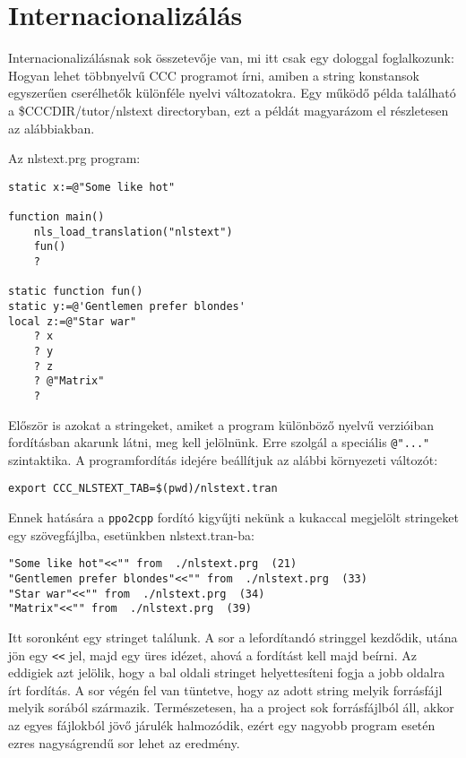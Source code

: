 \section{Internacionalizálás}

Internacionalizálásnak sok összetevője van, 
mi itt csak egy dologgal foglalkozunk: 
Hogyan lehet többnyelvű CCC programot írni, 
amiben a string konstansok egyszerűen cserélhetők különféle 
nyelvi változatokra. 
Egy működő példa található a \$CCCDIR/tutor/nlstext directoryban, 
ezt a példát magyarázom el részletesen az alábbiakban.

Az nlstext.prg program:
\begin{verbatim}
static x:=@"Some like hot"

function main()
    nls_load_translation("nlstext")
    fun()
    ?

static function fun()
static y:=@'Gentlemen prefer blondes'
local z:=@"Star war"
    ? x
    ? y
    ? z
    ? @"Matrix"
    ?
\end{verbatim}
Először is azokat a stringeket, amiket a program különböző 
nyelvű verzióiban fordításban akarunk látni, meg kell jelölnünk.
Erre szolgál a speciális \verb!@"..."! szintaktika.
A programfordítás idejére beállítjuk az alábbi 
környezeti változót:
\begin{verbatim}
export CCC_NLSTEXT_TAB=$(pwd)/nlstext.tran
\end{verbatim}
Ennek hatására a \verb!ppo2cpp! fordító kigyűjti nekünk a 
kukaccal megjelölt stringeket egy szövegfájlba, 
esetünkben nlstext.tran-ba:
\begin{verbatim}
"Some like hot"<<"" from  ./nlstext.prg  (21)
"Gentlemen prefer blondes"<<"" from  ./nlstext.prg  (33)
"Star war"<<"" from  ./nlstext.prg  (34)
"Matrix"<<"" from  ./nlstext.prg  (39)
\end{verbatim}
Itt soronként egy stringet találunk. A sor a lefordítandó
stringgel kezdődik, utána jön egy \verb!<<! jel, majd egy 
üres idézet, ahová a fordítást kell majd beírni.
Az eddigiek azt jelölik, hogy a bal oldali stringet 
helyettesíteni fogja a jobb oldalra írt fordítás.
A sor végén fel van tüntetve, hogy az adott string melyik
forrásfájl melyik sorából származik.  Természetesen,
ha a project sok forrásfájlból áll, akkor az egyes fájlokból
jövő járulék halmozódik, ezért egy nagyobb program esetén
ezres nagyságrendű sor lehet az eredmény.

